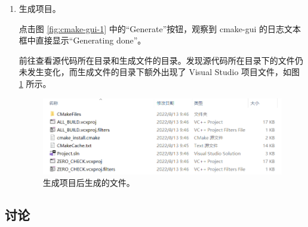 \begin{enumerate}
	\item 生成项目。\label{item:exp-3-4}

	点击图 \ref{fig:cmake-gui-1} 中的“Generate”按钮，观察到 cmake-gui 的日志文本框中直接显示“Generating done”。

	前往查看源代码所在目录和生成文件的目录。发现源代码所在目录下的文件仍未发生变化，而生成文件的目录下额外出现了 Visual Studio 项目文件，如图 \ref{fig:empty-cmake-6} 所示。

	\begin{figure}[H]
		\centering
		\includegraphics[width=0.9\linewidth]{assets/empty-cmake-6}
		\caption{生成项目后生成的文件。}
		\label{fig:empty-cmake-6}
	\end{figure}
\end{enumerate}

\subsection*{讨论}

